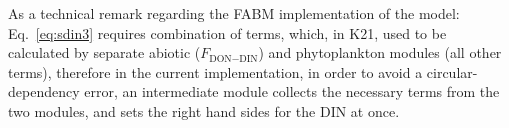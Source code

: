 \documentclass[gmd, manuscript]{copernicus}
\begin{document}
As a technical remark regarding the FABM implementation of the model: Eq.~\eqref{eq:sdin3} requires combination of terms, which, in K21, used to be calculated by separate abiotic ($F_{\text{DON}-\text{DIN}}$) and phytoplankton modules (all other terms), therefore in the current implementation, in order to avoid a circular-dependency error, an intermediate module collects the necessary terms from the two modules, and sets the right hand sides for the DIN at once.
\end{document}
